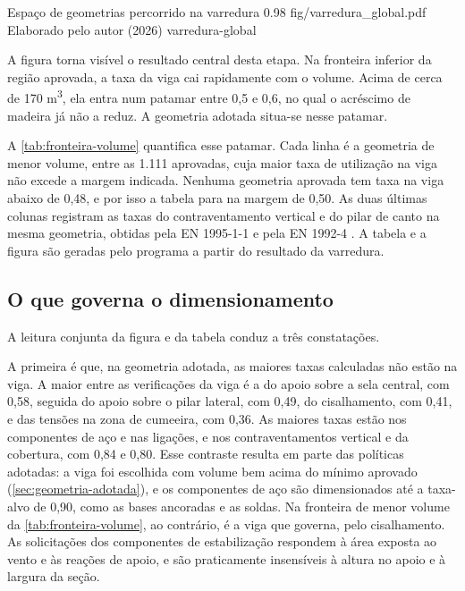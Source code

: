 \figura
{Espaço de geometrias percorrido na varredura}
{0.98}
{fig/varredura_global.pdf}
{Elaborado pelo autor (2026)}
{varredura-global}
{}
{}

A figura torna visível o resultado central desta etapa. Na fronteira inferior da
região aprovada, a taxa da viga cai rapidamente com o volume. Acima de cerca de
170 m\textsuperscript{3}, ela entra num patamar entre 0,5 e 0,6, no qual o
acréscimo de madeira já não a reduz. A geometria adotada situa-se nesse patamar.

A \autoref{tab:fronteira-volume} quantifica esse patamar. Cada linha é a
geometria de menor volume, entre as 1.111 aprovadas, cuja maior taxa de
utilização na viga não excede a margem indicada. Nenhuma geometria aprovada tem
taxa na viga abaixo de 0,48, e por isso a tabela para na margem de 0,50. As duas
últimas colunas registram as taxas do contraventamento vertical e do pilar de
canto na mesma geometria, obtidas pela EN 1995-1-1 \cite{EN1995-1-1:2004} e pela
EN 1992-4 \cite{EN1992-4:2018}. A tabela e a figura são geradas pelo programa a
partir do resultado da varredura.



\subsection{O que governa o dimensionamento}\label{ssec:o-que-governa}

A leitura conjunta da figura e da tabela conduz a três constatações.

A primeira é que, na geometria adotada, as maiores taxas calculadas não estão
na viga. A maior entre as verificações da viga é a do apoio sobre a sela
central, com 0,58, seguida do apoio sobre o pilar lateral, com 0,49, do
cisalhamento, com 0,41, e das tensões na zona de cumeeira, com 0,36. As maiores
taxas estão nos componentes de aço e nas ligações, e nos contraventamentos
vertical e da cobertura, com 0,84 e 0,80. Esse contraste resulta em parte das
políticas adotadas: a viga foi escolhida com volume bem acima do mínimo aprovado
(\autoref{sec:geometria-adotada}), e os componentes de aço são dimensionados até
a taxa-alvo de 0,90, como as bases ancoradas e as soldas. Na fronteira de menor
volume da \autoref{tab:fronteira-volume}, ao contrário, é a viga que governa,
pelo cisalhamento. As solicitações dos componentes de estabilização respondem à
área exposta ao vento e às reações de apoio, e são praticamente insensíveis à
altura no apoio e à largura da seção.

